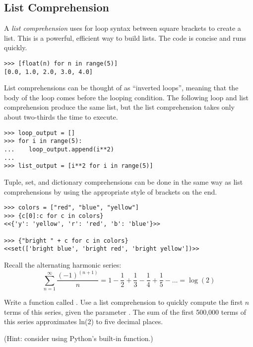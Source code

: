 \subsection*{List Comprehension} %

A \emph{list comprehension} uses for loop syntax between square brackets to create a list.
This is a powerful, efficient way to build lists.
The code is concise and runs quickly.

\begin{lstlisting}
>>> [float(n) for n in range(5)]
[0.0, 1.0, 2.0, 3.0, 4.0]
\end{lstlisting}

List comprehensions can be thought of as ``inverted loops'', meaning that the body of the loop comes before the looping condition.
The following loop and list comprehension produce the same list, but the list comprehension takes only about two-thirds the time to execute.

\begin{lstlisting}
>>> loop_output = []
>>> for i in range(5):
...    loop_output.append(i**2)
...
>>> list_output = [i**2 for i in range(5)]
\end{lstlisting}

Tuple, set, and dictionary comprehensions can be done in the same way as list comprehensions by using the appropriate style of brackets on the end.

\begin{lstlisting}
>>> colors = ["red", "blue", "yellow"]
>>> {c[0]:c for c in colors}
<<{'y': 'yellow', 'r': 'red', 'b': 'blue'}>>

>>> {"bright " + c for c in colors}
<<set(['bright blue', 'bright red', 'bright yellow'])>>
\end{lstlisting}

\begin{problem} %
Recall the alternating harmonic series:
\[\sum_{n=1}^\infty \frac{(-1)^{(n+1)}}{n} = 1 - \frac{1}{2} + \frac{1}{3} - \frac{1}{4} + \frac{1}{5} - ... = \log(2)\]

Write a function called .
Use a list comprehension to quickly compute the first $n$ terms of this series, given the parameter .
The sum of the first 500,000 terms of this series approximates ln(2) to five decimal places.

(Hint: consider using Python's built-in  function.)
\end{problem}

